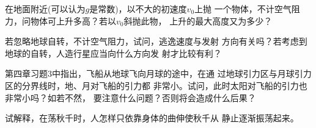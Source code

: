 \documentclass[../outline-of-mechanics.tex]{subfiles}
\begin{document}
\begin{questions}
  \question 在地面附近(可以认为$ g $是常数)，以不大的初速度$ v_0 $上抛
  一个物体，不计空气阻力，问物体可上升多高？若以$ v _ { 0 } $斜抛此物，
  上升的最大高度又为多少？

  \question 若忽略地球自转，不计空气阻力，试问，逃逸速度与发射
  方向有关吗？若考虑到地球的自转，人造行星应当向什么方向发
  射才比较有利？

  \question 第四章习题3中指出，飞船从地球飞向月球的途中，在通
  过地球引力区与月球引力区的分界线时，地、月对飞船的引力都
  非常小。试问，此时太阳对飞船的引力也非常小吗？如若不然，
  要注意什么问题？否则将会造成什么后果？

  \question 试解释，在荡秋千时，人怎样只依靠身体的曲伸使秋千从
  静止逐渐振荡起来。

\end{questions}
\end{document}
